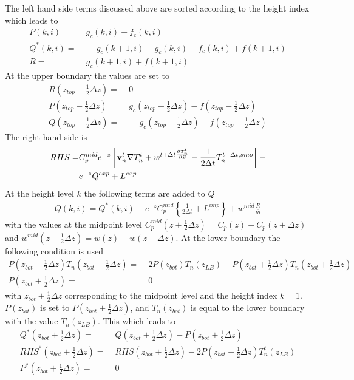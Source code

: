 %
The left hand side terms discussed above are sorted according to the
height index which leads to
%
\begin{align}
  P(k,i) = & \; g_c(k,i)-f_c(k,i) \\
  Q^*(k,i) = & \; -g_c(k+1,i)-g_c(k,i)-f_c(k,i)+f(k+1,i) \\
  R = & \; g_c(k+1,i) + f(k+1,i)
\end{align}
%
At the upper boundary the values are set to
%
\begin{align}
  R(z_{top}-\frac{1}{2} \Delta z)= & \; 0 \\
  P(z_{top}-\frac{1}{2} \Delta z) = & \; g_c(z_{top}-\frac{1}{2} \Delta z)-f(z_{top}-\frac{1}{2} \Delta z) \\
  Q(z_{top}-\frac{1}{2} \Delta z) = & \; -g_c(z_{top}-\frac{1}{2} \Delta z)-f(z_{top}-\frac{1}{2} \Delta z)
\end{align}
%
The right hand side is
%
\begin{align}
  RHS = & C_p^{mid} e^{-z} \left[ \mathbf{v}_n^t \nabla T_n^{t} + w^{t+\Delta t \frac{\partial T_n^t}{\partial Z}} -
       \frac{1}{2 \Delta t} T_n^{t-\Delta t,smo} \right] - \notag \\
   {} & e^{-z}
       Q^{exp}+ L^{exp}
\end{align}
%
At the height level $k$ the following terms are added to $Q$
%
\begin{align}
  Q(k,i) = Q^*(k,i) + e^{-z} C_p^{mid}\left\{ \frac{1}{2 \Delta t} + L^{imp}
  \right\} + w^{mid}\frac{R}{\overline{m}}
\end{align}
%
with the values at the midpoint level $C_p^{mid}(z+\frac{1}{2}
\Delta z) = C_p(z) + C_p(z + \Delta z)$ and $w^{mid}(z+\frac{1}{2} 
\Delta z) = w(z) + w(z+\Delta z)$. At the lower boundary the
following condition is used
%
\begin{align}
  P(z_{bot}-\frac{1}{2}\Delta z) T_n(z_{bot}-\frac{1}{2}\Delta z) = & \;
                   2 P(z_{bot}) T_n(z_{LB}) - P(z_{bot}+\frac{1}{2}\Delta z)
  T_n(z_{bot}+\frac{1}{2}\Delta z) \\
  P(z_{bot}+\frac{1}{2} \Delta z) = & \;  0
\end{align}
%
with $z_{bot}+\frac{1}{2} \Delta z$ corresponding to the midpoint
level and the height index $k=1$. $P(z_{bot})$ is set to
$P(z_{bot}+\frac{1}{2} \Delta z)$, and $T_n(z_{bot})$ is equal to
the lower boundary with the value $T_n(z_{LB})$. This which leads to
%
\begin{align}
  Q^*(z_{bot}+\frac{1}{2} \Delta z) = & \; Q(z_{bot}+\frac{1}{2} \Delta z) - P(z_{bot}+\frac{1}{2} \Delta z) \\
  RHS^*(z_{bot}+\frac{1}{2} \Delta z) = & \; RHS(z_{bot}+\frac{1}{2} \Delta z) - 2P(z_{bot}+\frac{1}{2} \Delta z) T_n^t(z_{LB}) \\
  P^*(z_{bot}+\frac{1}{2} \Delta z) = & \; 0
\end{align}
